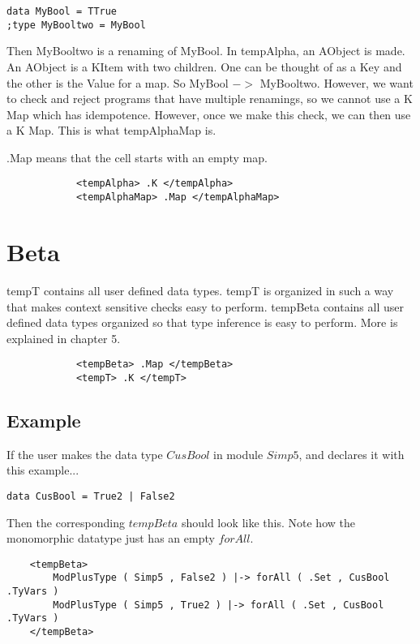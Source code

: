 \begin{lstlisting}
data MyBool = TTrue
;type MyBooltwo = MyBool
\end{lstlisting}

Then MyBooltwo is a renaming of MyBool. In tempAlpha, an AObject is made. An AObject is a KItem with two children. One can be thought of as a Key and the other is the Value for a map. So MyBool $->$ MyBooltwo. However, we want to check and reject programs that have multiple renamings, so we cannot use a K Map which has idempotence. However, once we make this check, we can then use a K Map. This is what tempAlphaMap is.

.Map means that the cell starts with an empty map.

\begin{lstlisting}
            <tempAlpha> .K </tempAlpha>
            <tempAlphaMap> .Map </tempAlphaMap>
\end{lstlisting}

\section{Beta}

tempT contains all user defined data types. tempT is organized in such a way that makes context sensitive checks easy to perform. tempBeta contains all user defined data types organized so that type inference is easy to perform. More is explained in chapter 5.
\begin{lstlisting}
            <tempBeta> .Map </tempBeta>
            <tempT> .K </tempT>
\end{lstlisting}

\subsection{Example}
If the user makes the data type $CusBool$ in module $Simp5$, and declares it with this example...
\begin{lstlisting}
data CusBool = True2 | False2
\end{lstlisting}

Then the corresponding $tempBeta$ should look like this. Note how the monomorphic datatype just has an empty $forAll$.

\begin{lstlisting}
    <tempBeta>
        ModPlusType ( Simp5 , False2 ) |-> forAll ( .Set , CusBool .TyVars )
        ModPlusType ( Simp5 , True2 ) |-> forAll ( .Set , CusBool .TyVars )
    </tempBeta>
\end{lstlisting}

